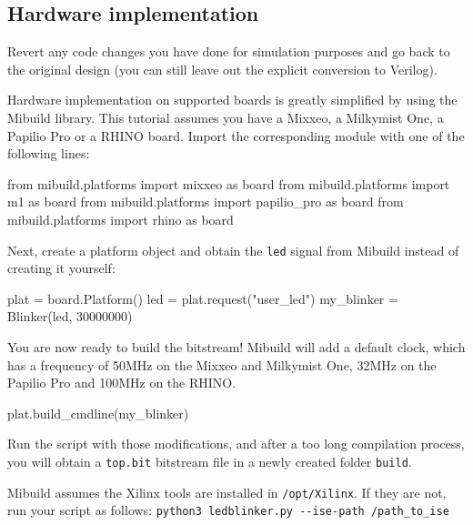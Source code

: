 \documentclass[11pt]{paper}
\begin{document}

\subsection{Hardware implementation}
Revert any code changes you have done for simulation purposes and go back to the original design (you can still leave out the explicit conversion to Verilog).

Hardware implementation on supported boards is greatly simplified by using the Mibuild library. This tutorial assumes you have a Mixxeo, a Milkymist One, a Papilio Pro or a RHINO board. Import the corresponding module with one of the following lines:

\begin{verbatimtab}
from mibuild.platforms import mixxeo as board
from mibuild.platforms import m1 as board
from mibuild.platforms import papilio_pro as board
from mibuild.platforms import rhino as board
\end{verbatimtab}


Next, create a platform object and obtain the \verb!led! signal from Mibuild instead of creating it yourself:
\begin{verbatimtab}
plat = board.Platform()
led = plat.request("user_led")
my_blinker = Blinker(led, 30000000)
\end{verbatimtab}

You are now ready to build the bitstream! Mibuild will add a default clock, which has a frequency of 50MHz on the Mixxeo and Milkymist One, 32MHz on the Papilio Pro and 100MHz on the RHINO.
\begin{verbatimtab}
plat.build_cmdline(my_blinker)
\end{verbatimtab}

Run the script with those modifications, and after a too long compilation process, you will obtain a \verb!top.bit! bitstream file in a newly created folder \verb!build!.

Mibuild assumes the Xilinx tools are installed in \verb!/opt/Xilinx!. If they are not, run your script as follows: \verb!python3 ledblinker.py --ise-path /path_to_ise!
\end{document}
